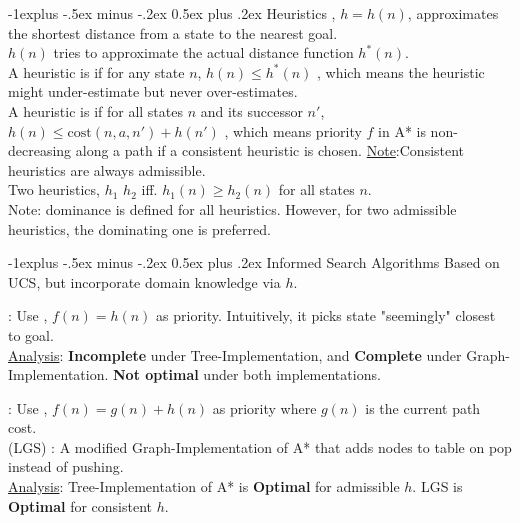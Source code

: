 \documentclass[10pt,landscape,letterpaper]{article}
\makeatletter
\renewcommand{\subsection}{\@startsection{subsection}{2}{0mm}%
                                {-1explus -.5ex minus -.2ex}%
                                {0.5ex plus .2ex}%
                                {\sffamily\normalsize\itshape}}
\makeatother
\begin{document}
\begin{multicols}{3}
\subsection{Heuristics}
, $h = h(n)$, approximates the shortest distance from a state to the nearest goal.\\
$h(n)$ tries to approximate the actual distance function $h^*(n)$.
\\
A heuristic is  if for any state $n$, $ h(n) \leq h^{*}(n) $ , which means the heuristic might under-estimate but never over-estimates.
\\
A heuristic is  if for all states $n$ and its successor $n'$, $h(n) \leq \text{cost}(n, a, n') + h(n')$ , which means priority $f$ in A* is non-decreasing along a path if a consistent heuristic is chosen. \underline{Note}:Consistent heuristics are always admissible.
\\
Two heuristics, $h_1$  $h_2$ iff. $h_1(n) \geq h_2(n)$ for all states $n$. \\
Note: dominance is defined for all heuristics. However, for two admissible heuristics, the dominating one is preferred.




\subsection{Informed Search Algorithms}
Based on UCS, but incorporate domain knowledge via $h$.

\smallskip

 : Use , $f(n) = h(n)$ as priority. Intuitively, it picks state "seemingly" closest to goal.
\\
\underline{Analysis}: \textbf{Incomplete} under Tree-Implementation, and \textbf{Complete} under Graph-Implementation. \textbf{Not optimal} under both implementations.

\smallskip

 : Use , $f(n) = g(n) + h(n)$ as priority where $g(n)$ is the current path cost.
\\
 (LGS) : A modified Graph-Implementation of A* that adds nodes to  table on pop instead of pushing.
\\
\underline{Analysis}: Tree-Implementation of A* is \textbf{Optimal} for admissible $h$. LGS is \textbf{Optimal} for consistent $h$.





\end{multicols}
\end{document}
